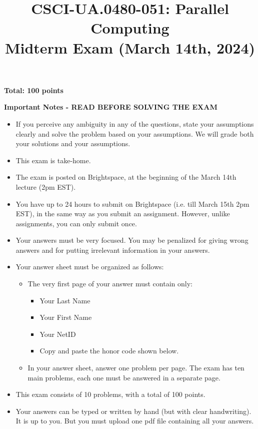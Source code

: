 \documentclass{article}
\begin{document}
\title{CSCI-UA.0480-051: Parallel Computing \\ Midterm Exam (March 14th, 2024)}
\author{}
\date{}
\maketitle

\textbf{Total: 100 points}

\textbf{Important Notes - READ BEFORE SOLVING THE EXAM}

\begin{itemize}
    \item If you perceive any ambiguity in any of the questions, state your assumptions clearly and solve the problem based on your assumptions. We will grade both your solutions and your assumptions.
    \item This exam is take-home.
    \item The exam is posted on Brightspace, at the beginning of the March 14th lecture (2pm EST).
    \item You have up to 24 hours to submit on Brightspace (i.e. till March 15th 2pm EST), in the same way as you submit an assignment. However, unlike assignments, you can only submit once.
    \item Your answers must be very focused. You may be penalized for giving wrong answers and for putting irrelevant information in your answers.
    \item Your answer sheet must be organized as follows:
    \begin{itemize}
        \item The very first page of your answer must contain only:
        \begin{itemize}
            \item Your Last Name
            \item Your First Name
            \item Your NetID
            \item Copy and paste the honor code shown below.
        \end{itemize}
        \item In your answer sheet, answer one problem per page. The exam has ten main problems, each one must be answered in a separate page.
    \end{itemize}
    \item This exam consists of 10 problems, with a total of 100 points.
    \item Your answers can be typed or written by hand (but with clear handwriting). It is up to you. But you must upload one pdf file containing all your answers.
\end{itemize}
\end{document}
